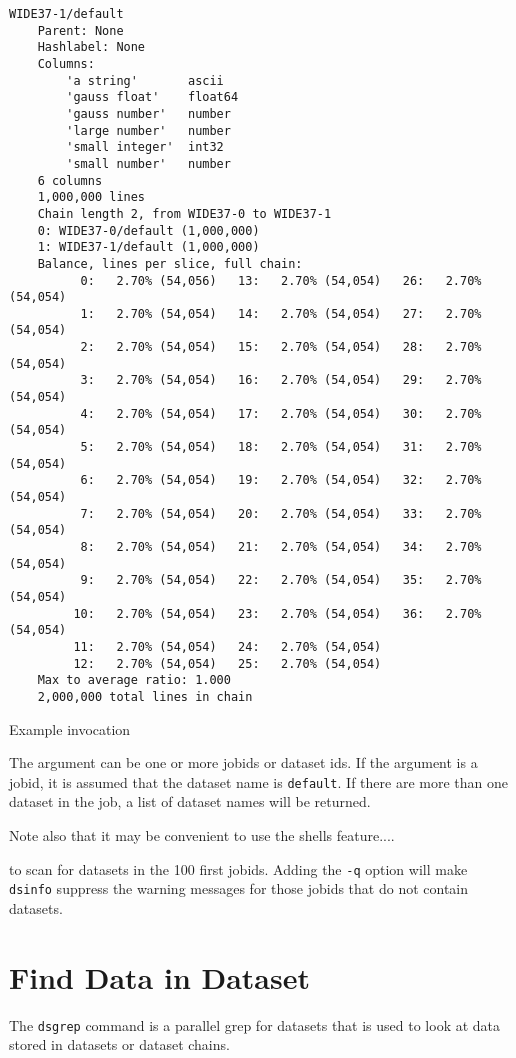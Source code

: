 \begin{verbatim}
WIDE37-1/default
    Parent: None
    Hashlabel: None
    Columns:
        'a string'       ascii
        'gauss float'    float64
        'gauss number'   number
        'large number'   number
        'small integer'  int32
        'small number'   number
    6 columns
    1,000,000 lines
    Chain length 2, from WIDE37-0 to WIDE37-1
    0: WIDE37-0/default (1,000,000)
    1: WIDE37-1/default (1,000,000)
    Balance, lines per slice, full chain:
          0:   2.70% (54,056)   13:   2.70% (54,054)   26:   2.70% (54,054)
          1:   2.70% (54,054)   14:   2.70% (54,054)   27:   2.70% (54,054)
          2:   2.70% (54,054)   15:   2.70% (54,054)   28:   2.70% (54,054)
          3:   2.70% (54,054)   16:   2.70% (54,054)   29:   2.70% (54,054)
          4:   2.70% (54,054)   17:   2.70% (54,054)   30:   2.70% (54,054)
          5:   2.70% (54,054)   18:   2.70% (54,054)   31:   2.70% (54,054)
          6:   2.70% (54,054)   19:   2.70% (54,054)   32:   2.70% (54,054)
          7:   2.70% (54,054)   20:   2.70% (54,054)   33:   2.70% (54,054)
          8:   2.70% (54,054)   21:   2.70% (54,054)   34:   2.70% (54,054)
          9:   2.70% (54,054)   22:   2.70% (54,054)   35:   2.70% (54,054)
         10:   2.70% (54,054)   23:   2.70% (54,054)   36:   2.70% (54,054)
         11:   2.70% (54,054)   24:   2.70% (54,054)
         12:   2.70% (54,054)   25:   2.70% (54,054)
    Max to average ratio: 1.000
    2,000,000 total lines in chain
\end{verbatim}

Example invocation
\begin{shell}
\end{shell}
The argument can be one or more jobids or dataset ids.  If the
argument is a jobid, it is assumed that the dataset name is
\texttt{default}.  If there are more than one dataset in the job, a
list of dataset names will be returned.

Note also that it may be convenient to use the shells feature....
\begin{shell}
\end{shell}
to scan for datasets in the 100 first jobids.  Adding the \texttt{-q}
option will make \texttt{dsinfo} suppress the warning messages for
those jobids that do not contain datasets.





\section{Find Data in Dataset}
The \texttt{dsgrep} command is a parallel grep for datasets that is
used to look at data stored in datasets or dataset chains.
